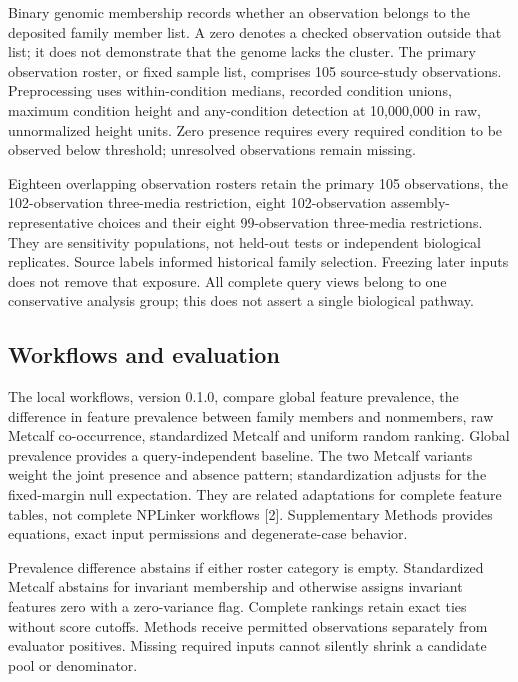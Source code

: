 \documentclass[
  10pt,
  a4paper,
]{article}
\begin{document}
Binary genomic membership records whether an observation belongs to the deposited family member list. A zero denotes a checked observation outside that list; it does not demonstrate that the genome lacks the cluster. The primary observation roster, or fixed sample list, comprises 105 source-study observations. Preprocessing uses within-condition medians, recorded condition unions, maximum condition height and any-condition detection at 10,000,000 in raw, unnormalized height units. Zero presence requires every required condition to be observed below threshold; unresolved observations remain missing.

Eighteen overlapping observation rosters retain the primary 105 observations, the 102-observation three-media restriction, eight 102-observation assembly-representative choices and their eight 99-observation three-media restrictions. They are sensitivity populations, not held-out tests or independent biological replicates. Source labels informed historical family selection. Freezing later inputs does not remove that exposure. All complete query views belong to one conservative analysis group; this does not assert a single biological pathway.

\subsection{Workflows and evaluation}\label{workflows-and-evaluation}

The local workflows, version 0.1.0, compare global feature prevalence, the difference in feature prevalence between family members and nonmembers, raw Metcalf co-occurrence, standardized Metcalf and uniform random ranking. Global prevalence provides a query-independent baseline. The two Metcalf variants weight the joint presence and absence pattern; standardization adjusts for the fixed-margin null expectation. They are related adaptations for complete feature tables, not complete NPLinker workflows {[}2{]}. Supplementary Methods provides equations, exact input permissions and degenerate-case behavior.

Prevalence difference abstains if either roster category is empty. Standardized Metcalf abstains for invariant membership and otherwise assigns invariant features zero with a zero-variance flag. Complete rankings retain exact ties without score cutoffs. Methods receive permitted observations separately from evaluator positives. Missing required inputs cannot silently shrink a candidate pool or denominator.
\end{document}
